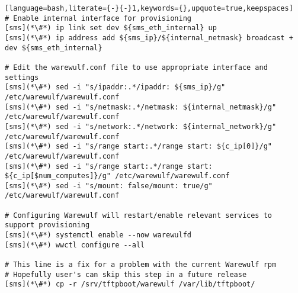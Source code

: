 
\begin{lstlisting}[language=bash,literate={-}{-}1,keywords={},upquote=true,keepspaces]
# Enable internal interface for provisioning
[sms](*\#*) ip link set dev ${sms_eth_internal} up
[sms](*\#*) ip address add ${sms_ip}/${internal_netmask} broadcast + dev ${sms_eth_internal}

# Edit the warewulf.conf file to use appropriate interface and settings
[sms](*\#*) sed -i "s/ipaddr:.*/ipaddr: ${sms_ip}/g" /etc/warewulf/warewulf.conf
[sms](*\#*) sed -i "s/netmask:.*/netmask: ${internal_netmask}/g" /etc/warewulf/warewulf.conf
[sms](*\#*) sed -i "s/network:.*/network: ${internal_network}/g" /etc/warewulf/warewulf.conf
[sms](*\#*) sed -i "s/range start:.*/range start: ${c_ip[0]}/g" /etc/warewulf/warewulf.conf
[sms](*\#*) sed -i "s/range start:.*/range start: ${c_ip[$num_computes]}/g" /etc/warewulf/warewulf.conf
[sms](*\#*) sed -i "s/mount: false/mount: true/g" /etc/warewulf/warewulf.conf

# Configuring Warewulf will restart/enable relevant services to support provisioning
[sms](*\#*) systemctl enable --now warewulfd
[sms](*\#*) wwctl configure --all

# This line is a fix for a problem with the current Warewulf rpm
# Hopefully user's can skip this step in a future release
[sms](*\#*) cp -r /srv/tftpboot/warewulf /var/lib/tftpboot/ 
\end{lstlisting}
